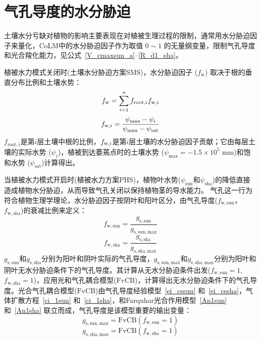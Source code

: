 \section{气孔导度的水分胁迫}\label{气孔导度的水分胁迫}
土壤水分亏缺对植物的影响主要表现在对植被生理过程的限制，通常用水分胁迫因子来量化，CoLM中的水分胁迫因子作为取值 $0\sim 1$ 的无量纲变量，限制气孔导度和光合羧化能力，见公式~\eqref{V_cmaxsun_a}--\eqref{R_d1_sha}。

植被水力模式关闭时(土壤水分胁迫方案SMS)，水分胁迫因子 ($f_{\mathrm {w}}$) 取决于根的垂直分布比例和土壤水势：
\begin{equation}\label{beta_0}
  f_{\rm w}=\sum_{i=1}^{n} f_{\mathrm {root},i} f_{{\rm w},i}
\end{equation}
%
\begin{equation}\label{beta_i}
  f_{{\rm w},i}=\frac{\psi_{\mathrm{\max }}-\psi_i}{\psi_{\mathrm{\max }}-\psi_{\mathrm{s a t}}}
\end{equation}
$f_{\mathrm {root},i}$是第$i$层土壤中根的比例，$f_{{\rm w},i}$是第$i$层土壤的水分胁迫因子贡献；它由每层土壤的实际水势 ($\psi_i$)，植被到达萎蔫点时的土壤水势 ($\psi_{\mathrm{max}}=-1.5\times 10^5$ \unit{mm})和饱和水势 ($\psi_{\mathrm{sat}}$)计算得出。

当植被水力模式开启时(植被水力方案PHS)，植物叶水势($\psi_{\mathrm{sun}}$和$\psi_{\mathrm{sha}}$)的降低直接造成植物水分胁迫，从而导致气孔关闭以保持植物茎的导水能力。
气孔这一行为符合植物生理学理论，水分胁迫因子按阴叶和阳叶区分，由气孔导度($f_{\mathrm{w,sun}}$，$f_{\mathrm{w,sha}}$)的衰减比例来定义：
\begin{equation}\label{beta_sun}
  f_{\mathrm{w,sun}}=\frac{g_{\mathrm{s,sun}}}{g_{\mathrm{s,sun,max}}}
\end{equation}
\begin{equation}\label{beta_sha}
  f_{\mathrm{w,sha}}=\frac{g_{\mathrm{s,sha}}}{g_{\mathrm{s,sha,max}}}
\end{equation}
$g_{\mathrm{s,sun}}$和$g_{\mathrm{s,sha}}$分别为阳叶和阴叶实际的气孔导度，$g_{\mathrm{s,sun,max}}$和$g_{\mathrm{s,sha,max}}$分别为阳叶和阴叶无水分胁迫条件下的气孔导度。其计算从无水分胁迫条件出发($f_{\mathrm{w,sun}}=1$, $f_{\mathrm{w,sha}}=1$)，应用光和气孔耦合模型(${\mathrm {FvCB}}$)，计算得出无水分胁迫条件下的气孔导度。光合气孔耦合模型(${\mathrm {FvCB}}$)由气孔导度经验模型~\eqref{ei_cssun} 和~\eqref{ei_cssha}，气体扩散方程~\eqref{ci_1sun} 和~\eqref{ci_1sha}，和Farquhar光合作用模型~\eqref{An1sun} 和~\eqref{An1sha} 联立而成，气孔导度是该模型重要的输出变量：
\begin{equation}\label{gs_sunmax}
  g_{\mathrm{s,sun,max}}=\text{FvCB}\left(f_{\mathrm{w,sun}}=1\right)
\end{equation}
\begin{equation}\label{gs_shamax}
  g_{\mathrm{s,sha,max}}=\text{FvCB}\left(f_{\mathrm{w,sha}}=1\right)
\end{equation}


